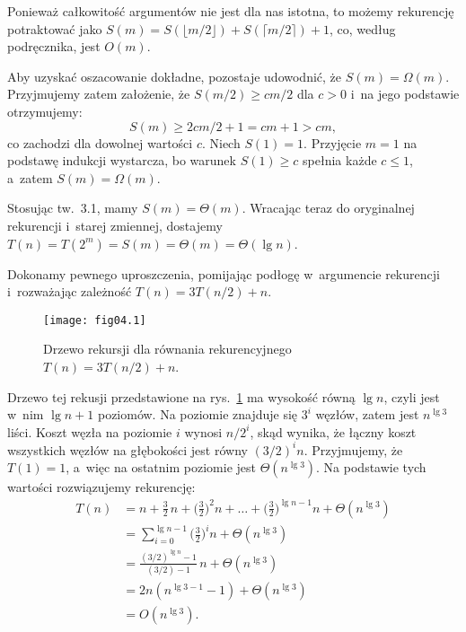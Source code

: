Ponieważ całkowitość argumentów nie jest dla nas istotna, to możemy rekurencję potraktować jako $S(m)=S(\lfloor m/2\rfloor)+S(\lceil m/2\rceil)+1$, co, według podręcznika, jest $O(m)$.

Aby uzyskać oszacowanie dokładne, pozostaje udowodnić, że $S(m)=\Omega(m)$. Przyjmujemy zatem założenie, że $S(m/2)\ge cm/2$ dla $c>0$ i~na jego podstawie otrzymujemy:
\[
	S(m) \ge 2cm/2+1 = cm+1 > cm,
\]
co zachodzi dla dowolnej wartości $c$. Niech $S(1)=1$. Przyjęcie $m=1$ na podstawę indukcji wystarcza, bo warunek $S(1)\ge c$ spełnia każde $c\le1$, a~zatem $S(m)=\Omega(m)$.

Stosując tw.~3.1, mamy $S(m)=\Theta(m)$. Wracając teraz do oryginalnej rekurencji i~starej zmiennej, dostajemy $T(n)=T(2^m)=S(m)=\Theta(m)=\Theta(\lg n)$.


\exercise %
Dokonamy pewnego uproszczenia, pomijając podłogę w~argumencie rekurencji i~rozważając zależność $T(n)=3T(n/2)+n$.
\begin{figure}[ht]
	\begin{center}
		\texttt{[image: fig04.1]}
	\end{center}
	\caption{Drzewo rekursji dla równania rekurencyjnego $T(n)=3T(n/2)+n$.} \label{fig:4.2-1}
\end{figure}
Drzewo tej rekusji przedstawione na rys.~\ref{fig:4.2-1} ma wysokość równą $\lg n$, czyli jest w~nim $\lg n+1$ poziomów. Na  poziomie znajduje się $3^i$ węzłów, zatem jest $n^{\lg3}$ liści. Koszt węzła na poziomie $i$ wynosi $n/2^i$, skąd wynika, że łączny koszt wszystkich węzłów na  głębokości jest równy $(3/2)^in$. Przyjmujemy, że $T(1)=1$, a~więc na ostatnim poziomie jest $\Theta(n^{\lg3})$. Na podstawie tych wartości rozwiązujemy rekurencję:
\begin{align*}
	T(n) &= n+\frac{3}{2}\,n+\biggl(\frac{3}{2}\biggr)^2n+\dots+\biggl(\frac{3}{2}\biggr)^{\lg n-1}n+\Theta(n^{\lg3}) \\
	&= \sum_{i=0}^{\lg n-1}\biggl(\frac{3}{2}\biggr)^in+\Theta(n^{\lg3}) \\
	&= \frac{(3/2)^{\lg n}-1}{(3/2)-1}\,n+\Theta(n^{\lg3}) \\[1mm]
	&= 2n(n^{\lg3-1}-1)+\Theta(n^{\lg3}) \\
	&= O(n^{\lg3}).
\end{align*}

